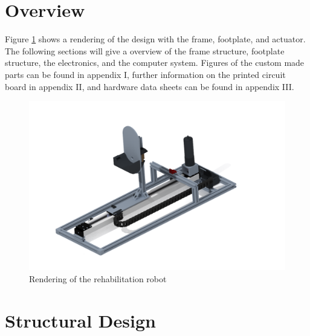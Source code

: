 \documentclass[12pt]{report}
\begin{document}
	
		
		
	
	

	\section{Overview}
	
Figure \ref{fig:cad} shows a rendering of the design with the frame, footplate, and actuator. The following sections will give a overview of the frame structure, footplate structure, the electronics, and the computer system. Figures of the custom made parts can be found in appendix I, further information on the printed circuit board in appendix II, and hardware data sheets can be found in appendix III.

	\begin{figure}[h] 
		\centering
		\includegraphics[width=\linewidth]{robo_test1}
		\caption{Rendering of the rehabilitation robot}
		\label{fig:cad}
	\end{figure}
	
	
	\section{Structural Design}
	
\end{document}
